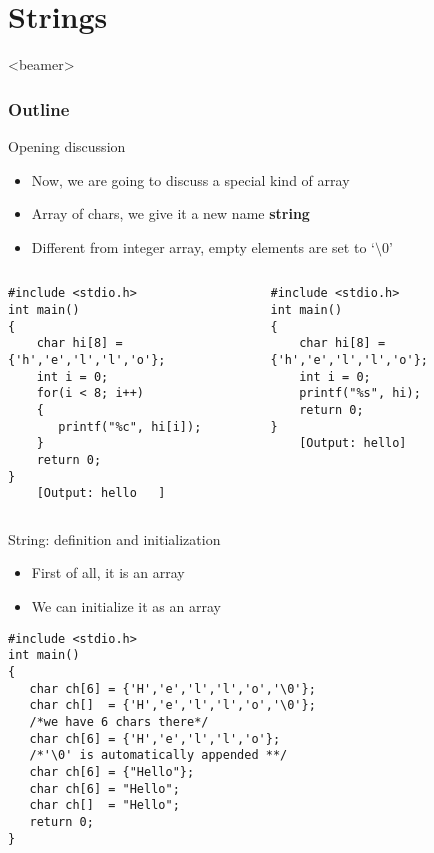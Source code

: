 \section{Strings}
\label{sec:str}
\begin{frame}<beamer>
    \frametitle{Outline}
    \tableofcontents[currentsection]
\end{frame}

\begin{frame}[fragile]{Opening discussion}
	\begin{itemize}
		\item {Now, we are going to discuss a special kind of array}
		\item {Array of chars, we give it a new name \textbf{string}}
		\item {Different from integer array, empty elements are set to `$\setminus$0'}
	\end{itemize}
	\begin{columns}
	\begin{column}{0.47\linewidth}
	\begin{lstlisting}
#include <stdio.h>
int main()
{
    char hi[8] ={'h','e','l','l','o'};
    int i = 0;
    for(i < 8; i++)
    {
       printf("%c", hi[i]);
    }
    return 0;
}
	[Output: hello   ]
	\end{lstlisting}
	\end{column}
	\begin{column}{0.47\linewidth}
	\begin{lstlisting}
#include <stdio.h>
int main()
{
    char hi[8] ={'h','e','l','l','o'};
    int i = 0;
    printf("%s", hi);
    return 0;
}
	[Output: hello]
	\end{lstlisting}
	\end{column}
	\end{columns}
\end{frame}

\begin{frame}[fragile]{String: definition and initialization}
\begin{itemize}
	\item {First of all, it is an array}
	\item {We can initialize it as an array}
\end{itemize}
\begin{lstlisting}
#include <stdio.h>
int main()
{
   char ch[6] = {'H','e','l','l','o','\0'};
   char ch[]  = {'H','e','l','l','o','\0'};
   /*we have 6 chars there*/
   char ch[6] = {'H','e','l','l','o'}; 
   /*'\0' is automatically appended **/
   char ch[6] = {"Hello"};
   char ch[6] = "Hello";
   char ch[]  = "Hello";
   return 0;
}
\end{lstlisting}
\end{frame}

